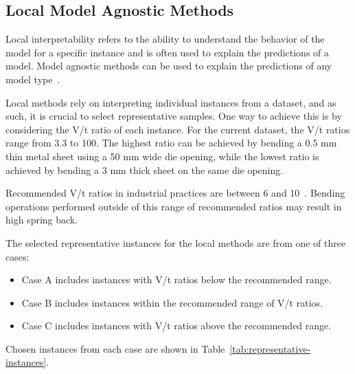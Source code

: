 \subsection*{Local Model Agnostic Methods}
Local interpretability refers to the ability to understand the behavior of the model for a
specific instance and is often used to explain the predictions of a model.
Model agnostic methods can be used to explain the predictions of any model type~\cite{
    molnar2020interpretable}.


Local methods rely on interpreting individual instances from a dataset, and as such, it is
crucial to select representative samples. One way to achieve this is by considering the V/t ratio
of each instance.
For the current dataset, the V/t ratios range from 3.3 to 100. The highest ratio can be achieved
by bending a 0.5 mm thin metal sheet using a 50 mm wide die opening, while the lowest ratio is
achieved by bending a 3 mm thick sheet on the same die opening.

Recommended V/t ratios in industrial practices are between 6 and 10~\cite[p.7]{
    cruz_applicationmachinelearning_2021}.
Bending operations performed outside of this range of recommended ratios may result in
high spring back.

The selected representative instances for the local methods are from one of three cases:
\begin{itemize}
    \item Case A includes instances with V/t ratios below the recommended range.
    \item Case B includes instances within the recommended range of V/t ratios.
    \item Case C includes instances with V/t ratios above the recommended range.
\end{itemize}

Chosen instances from each case are shown in Table~\ref{tab:representative-instances}.

